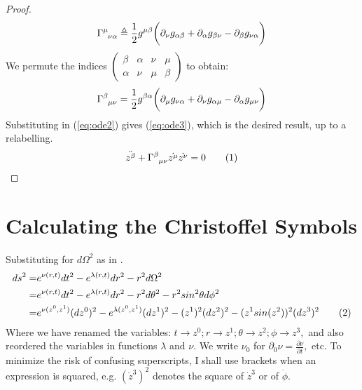 \documentclass[]{article}
\newcommand\numberthis{\addtocounter{equation}{1}\tag{\theequation}}
\begin{document}
\begin{proof}
\begin{align*}
    \Gamma\indices{^\mu_\nu_\alpha} \triangleq \frac{1}{2}g^{\mu\beta} \bigg(\partial_{\nu}g_{\alpha\beta} +\partial_{\alpha}g_{\beta\nu} - \partial_{\beta}g_{\nu\alpha}\bigg)
    \end{align*}
    We permute the indices $\begin{pmatrix}
    \beta & \alpha & \nu & \mu \\
    \alpha & \nu & \mu & \beta
    \end{pmatrix}$ to obtain:
    \begin{align*}
     \Gamma\indices{^\beta_\mu_\nu} = \frac{1}{2}g^{\beta\alpha} \bigg(\partial_{\mu}g_{\nu\alpha} +\partial_{\nu}g_{\alpha\mu} - \partial_{\alpha}g_{\mu\nu}\bigg)
    \end{align*}
    Substituting in (\ref{eq:ode2}) gives (\ref{eq:ode3}), which is the desired result, up to a relabelling.
    \begin{align*}
    \ddot{z^{\beta}} + \Gamma\indices{^\beta_\mu_\nu}   \dot{z^\mu} \dot{z^\nu} =0 \numberthis \label{eq:ode3}
    \end{align*}
\end{proof}
\section{Calculating the Christoffel Symbols}
Substituting for $d\Omega^2$ as in \cite{akhmedev2016}.
\begin{align*}
ds^2 =& e^{\nu(r,t)} dt^2 - e^{\lambda(r,t)} dr ^ 2 -r^2 d\Omega^2\\
=& e^{\nu(r,t)} dt^2 - e^{\lambda(r,t)} dr ^ 2 -r^2 d\theta^2 - r^2 sin^{2}\theta d\phi^2 \\
=& e^{\nu(z^0,z^1)} (dz^0)^2 - e^{\lambda(z^0,z^1)} (dz^1) ^ 2 -(z^1)^2 (dz^2)^2 - (z^1 sin(z^2))^2  (dz^3)^2 \numberthis \label{eq:metric}
\end{align*}
Where we have renamed the variables: $t\rightarrow z^0; r\rightarrow z^1; \theta\rightarrow z^2; \phi \rightarrow z^3,$ and also reordered the variables in functions $\lambda$ and $\nu$. We write $\nu_0$ for $\partial_0\nu=\frac{\partial\nu}{\partial t},$ etc.  To minimize the risk of confusing superscripts, I shall use brackets when an expression is squared, e.g. $(\dot z^3)^2$ denotes the square of $\dot z^3$ or of $\dot \phi$.
\end{document}

